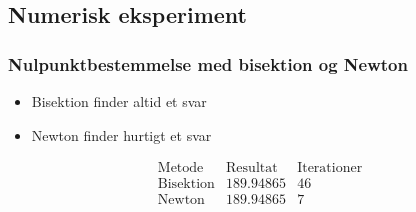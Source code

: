 \subsection{Numerisk eksperiment}
\begin{frame}
\frametitle{Nulpunktbestemmelse med \phantom{Heeekjjjjeej} bisektion og Newton}
\begin{itemize}
\item Bisektion finder altid et svar
\item Newton finder hurtigt et svar
\end{itemize}

$$\begin{array}{l|c|c}
\text{Metode} & \text{Resultat} & \text{Iterationer}\\
\hline
\text{Bisektion}	& 189.94865 & 46\\
\text{Newton}		& 189.94865 & 7\\
\end{array}$$

\end{frame}
